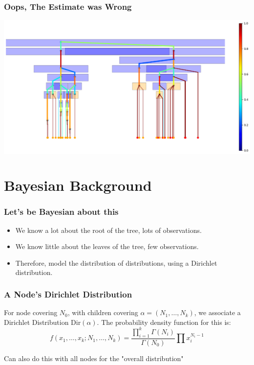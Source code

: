\documentclass{beamer}
\begin{document}
\begin{frame}
\frametitle{Oops, The Estimate was Wrong}
\begin{center}
    \includegraphics[scale=0.35]{1d_vis_post_prob_9.png}
\end{center}
\end{frame}

\section{Bayesian Background}
\begin{frame}
    \frametitle{Let's be Bayesian about this}
    \begin{itemize}
        \item We know a lot about the root of the tree, lots of observations.
        \item We know little about the leaves of the tree, few observations.
        \item Therefore, model the distribution of distributions, using a Dirichlet distribution.
    \end{itemize}
\end{frame}

\begin{frame}
    \frametitle{A Node's Dirichlet Distribution}
    For node covering $N_0$, with children covering $\alpha = (N_1, \dots, N_k)$, we associate a Dirichlet Distribution
    $\text{Dir}(\alpha)$. The probability density function for this is:
    $$f(x_1, \dots, x_k ; N_1, \dots, N_k) = \frac{\prod_{i=1}^k \Gamma(N_i)}{\Gamma(N_0)} \prod x_i^{N_i - 1}$$
    
    Can also do this with all nodes for the "overall distribution"
\end{frame}
\end{document}
